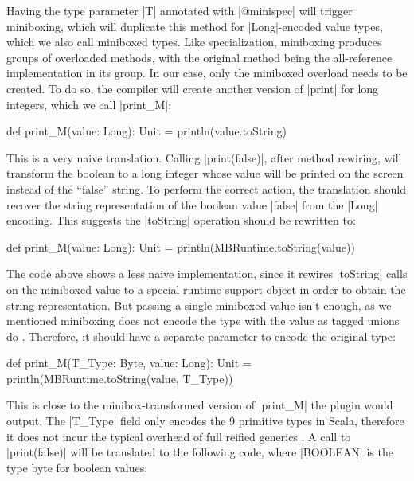 Having the type parameter |T| annotated with |@minispec| will trigger miniboxing, which will duplicate this method for |Long|-encoded value types, which we also call miniboxed types. Like specialization, miniboxing produces groups of overloaded methods, with the original method being the all-reference implementation in its group. In our case, only the miniboxed overload needs to be created. To do so, the compiler will create another version of |print| for long integers, which we call |print_M|:

\begin{lstlisting-nobreak}
 def print_M(value: Long): Unit = println(value.toString)
\end{lstlisting-nobreak}

This is a very naive translation. Calling |print(false)|, after method rewiring, will transform the boolean to a long integer whose value will be printed on the screen instead of the ``false'' string. To perform the correct action, the translation should recover the string representation of the boolean value |false| from the |Long| encoding. This suggests the |toString| operation should be rewritten to:

\begin{lstlisting-nobreak}
 def print_M(value: Long): Unit = println(MBRuntime.toString(value))
\end{lstlisting-nobreak}

The code above shows a less naive implementation, since it rewires |toString| calls on the miniboxed value to a special runtime support object in order to obtain the string representation. But passing a single miniboxed value isn't enough, as we mentioned miniboxing does not encode the type with the value as tagged unions do \cite{tagged-unions-lua}. Therefore, it should have a separate parameter to encode the original type:

\begin{lstlisting-nobreak}
 def print_M(T_Type: Byte, value: Long): Unit = println(MBRuntime.toString(value, T_Type))
\end{lstlisting-nobreak}

This is close to the minibox-transformed version of |print_M| the plugin would output. The |T_Type| field only encodes the 9 primitive types in Scala, therefore it does not incur the typical overhead of full reified generics \cite{michel-thesis}. A call to |print(false)| will be translated to the following code, where |BOOLEAN| is the type byte for boolean values:

